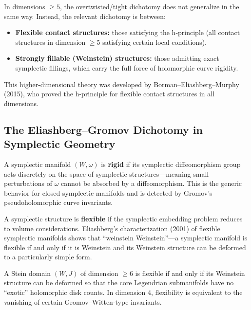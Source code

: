 \begin{remark}
In dimensions $\geq 5$, the overtwisted/tight dichotomy does not generalize in the same way. Instead, the relevant dichotomy is between:
\begin{itemize}
    \item \textbf{Flexible contact structures:} those satisfying the h-principle (all contact structures in dimension $\geq 5$ satisfying certain local conditions).
    \item \textbf{Strongly fillable (Weinstein) structures:} those admitting exact symplectic fillings, which carry the full force of holomorphic curve rigidity.
\end{itemize}
This higher-dimensional theory was developed by Borman--Eliashberg--Murphy (2015), who proved the h-principle for flexible contact structures in all dimensions.
\end{remark}

\subsection{The Eliashberg--Gromov Dichotomy in Symplectic Geometry}

\begin{definition}
A symplectic manifold $(W, \omega)$ is \textbf{rigid} if its symplectic diffeomorphism group acts discretely on the space of symplectic structures---meaning small perturbations of $\omega$ cannot be absorbed by a diffeomorphism. This is the generic behavior for closed symplectic manifolds and is detected by Gromov's pseudoholomorphic curve invariants.
\end{definition}

\begin{definition}
A symplectic structure is \textbf{flexible} if the symplectic embedding problem reduces to volume considerations. Eliashberg's characterization (2001) of flexible symplectic manifolds shows that ``weinstein Weinstein''---a symplectic manifold is flexible if and only if it is Weinstein and its Weinstein structure can be deformed to a particularly simple form.
\end{definition}

\begin{theorem}[Eliashberg, 2001]
A Stein domain $(W, J)$ of dimension $\geq 6$ is flexible if and only if its Weinstein structure can be deformed so that the core Legendrian submanifolds have no ``exotic'' holomorphic disk counts. In dimension 4, flexibility is equivalent to the vanishing of certain Gromov--Witten-type invariants.
\end{theorem}

